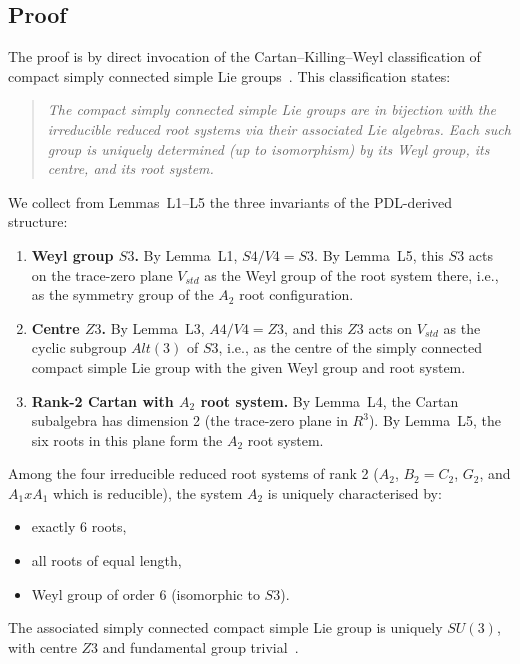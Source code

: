 \documentclass[11pt,a4paper]{article}
\def\Sfour{S4}%
\def\Vfour{V4}%
\def\Afour{A4}%
\def\Sthree{S3}%
\def\Zthree{Z3}%
\def\SUthree{SU(3)}%
\def\PDL{PDL}%
\def\cong{=}%
\def\times{x}%
\def\RR{R}%
\def\mathbb#1{#1}%
\def\mathrm#1{#1}%
\def\textsc#1{#1}%
\theoremstyle{plain}
\theoremstyle{definition}
\theoremstyle{remark}
\newcommand{\PDL}{\textsc{PDL}}
\newcommand{\Sfour}{S_4}
\newcommand{\Afour}{A_4}
\newcommand{\Vfour}{V_4}
\newcommand{\Sthree}{S_3}
\newcommand{\Zthree}{\mathbb{Z}_3}
\newcommand{\SUthree}{\mathrm{SU}(3)}
\newcommand{\RR}{\mathbb{R}}
\begin{document}
\subsection{Proof}

The proof is by direct invocation of the Cartan--Killing--Weyl classification of compact simply connected simple Lie groups~\cite{Bourbaki_Lie,Humphreys_Lie,Hall_Lie}. This classification states:

\begin{quote}
\textit{The compact simply connected simple Lie groups are in bijection with the irreducible reduced root systems via their associated Lie algebras. Each such group is uniquely determined (up to isomorphism) by its Weyl group, its centre, and its root system.}
\end{quote}

We collect from Lemmas~L1--L5 the three invariants of the \PDL-derived structure:

\begin{enumerate}[label=(\arabic*),leftmargin=2em]
\item \textbf{Weyl group $\Sthree$.} By Lemma~L1, $\Sfour/\Vfour \cong \Sthree$. By Lemma~L5, this $\Sthree$ acts on the trace-zero plane $V_{\mathrm{std}}$ as the Weyl group of the root system there, i.e., as the symmetry group of the $A_2$ root configuration.
\item \textbf{Centre $\Zthree$.} By Lemma~L3, $\Afour/\Vfour \cong \Zthree$, and this $\Zthree$ acts on $V_{\mathrm{std}}$ as the cyclic subgroup $\mathrm{Alt}(3)$ of $\Sthree$, i.e., as the centre of the simply connected compact simple Lie group with the given Weyl group and root system.
\item \textbf{Rank-2 Cartan with $A_2$ root system.} By Lemma~L4, the Cartan subalgebra has dimension 2 (the trace-zero plane in $\RR^3$). By Lemma~L5, the six roots in this plane form the $A_2$ root system.
\end{enumerate}

Among the four irreducible reduced root systems of rank 2 ($A_2$, $B_2 = C_2$, $G_2$, and $A_1 \times A_1$ which is reducible), the system $A_2$ is uniquely characterised by:
\begin{itemize}[leftmargin=2em]
\item exactly 6 roots,
\item all roots of equal length,
\item Weyl group of order 6 (isomorphic to $\Sthree$).
\end{itemize}
The associated simply connected compact simple Lie group is uniquely $\SUthree$, with centre $\Zthree$ and fundamental group trivial~\cite{Bourbaki_Lie,Humphreys_Lie,Hall_Lie}.
\end{document}
